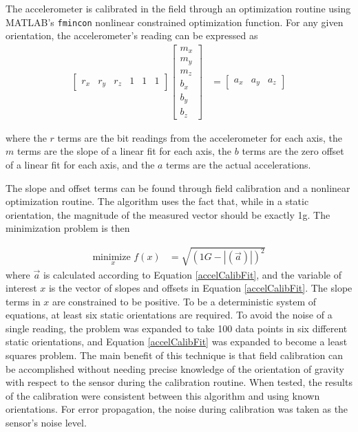 The accelerometer is calibrated in the field through an optimization routine using MATLAB's \texttt{fmincon} nonlinear constrained optimization function. For any given orientation, the accelerometer's reading can be expressed as
\begin{align}
\label{accelCalibFit}
\begin{bmatrix}
r_x & r_y & r_z & 1 & 1 & 1
\end{bmatrix} 
\begin{bmatrix}
m_x \\ m_y \\ m_z \\ b_x \\ b_y \\ b_z
\end{bmatrix} &= \begin{bmatrix} a_x & a_y & a_z \end{bmatrix}
\end{align}

where the $r$ terms are the bit readings from the accelerometer for each axis, the $m$ terms are the slope of a linear fit for each axis, the $b$ terms are the zero offset of a linear fit for each axis, and the $a$ terms are the actual accelerations.
 
 The slope and offset terms can be found through field calibration and a nonlinear optimization routine. The algorithm uses the fact that, while in a static orientation, the magnitude of the measured vector should be exactly 1g. The minimization problem is then

\begin{align}
\underset{x}{\text{minimize }} f(x) &= \sqrt{(1G-|(\vec{a})|)^2}
\end{align}
where $\vec{a}$ is calculated according to Equation \ref{accelCalibFit}, and the variable of interest $x$ is the vector of slopes and offsets in Equation \ref{accelCalibFit}. The slope terms in $x$ are constrained to be positive. To be a deterministic system of equations, at least six static orientations are required. To avoid the noise of a single reading, the problem was expanded to take 100 data points in six different static orientations, and Equation \ref{accelCalibFit} was expanded to become a least squares problem. The main benefit of this technique is that field calibration can be accomplished without needing precise knowledge of the orientation of gravity with respect to the sensor during the calibration routine. When tested, the results of the calibration were consistent between this algorithm and using known orientations. For error propagation, the noise during calibration was taken as the sensor's noise level.

